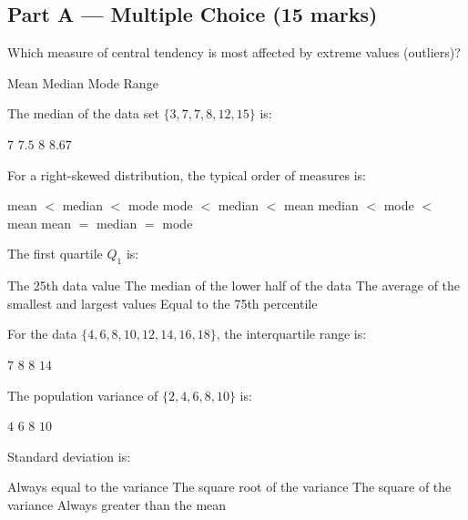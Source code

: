 \documentclass[addpoints]{exam}
\begin{document}
\newpage
\begin{questions}

\section*{Part A --- Multiple Choice (15 marks)}
\vspace{5mm}

\question[1] Which measure of central tendency is most affected by extreme values (outliers)?
\begin{choices}
    \correctchoice Mean
    \choice Median
    \choice Mode
    \choice Range
\end{choices}

\question[1] The median of the data set $\{3, 7, 7, 8, 12, 15\}$ is:
\begin{choices}
    \choice $7$
    \correctchoice $7.5$
    \choice $8$
    \choice $8.67$
\end{choices}

\question[1] For a right-skewed distribution, the typical order of measures is:
\begin{choices}
    \choice mean $<$ median $<$ mode
    \correctchoice mode $<$ median $<$ mean
    \choice median $<$ mode $<$ mean
    \choice mean $=$ median $=$ mode
\end{choices}

\question[1] The first quartile $Q_1$ is:
\begin{choices}
    \choice The 25th data value
    \correctchoice The median of the lower half of the data
    \choice The average of the smallest and largest values
    \choice Equal to the 75th percentile
\end{choices}

\question[1] For the data $\{4, 6, 8, 10, 12, 14, 16, 18\}$, the interquartile range is:
\begin{choices}
    \choice $7$
    \choice $8$
    \correctchoice $8$
    \choice $14$
\end{choices}

\question[1] The population variance of $\{2, 4, 6, 8, 10\}$ is:
\begin{choices}
    \choice $4$
    \choice $6$
    \correctchoice $8$
    \choice $10$
\end{choices}

\question[1] Standard deviation is:
\begin{choices}
    \choice Always equal to the variance
    \correctchoice The square root of the variance
    \choice The square of the variance
    \choice Always greater than the mean
\end{choices}


\end{questions}
\end{document}
